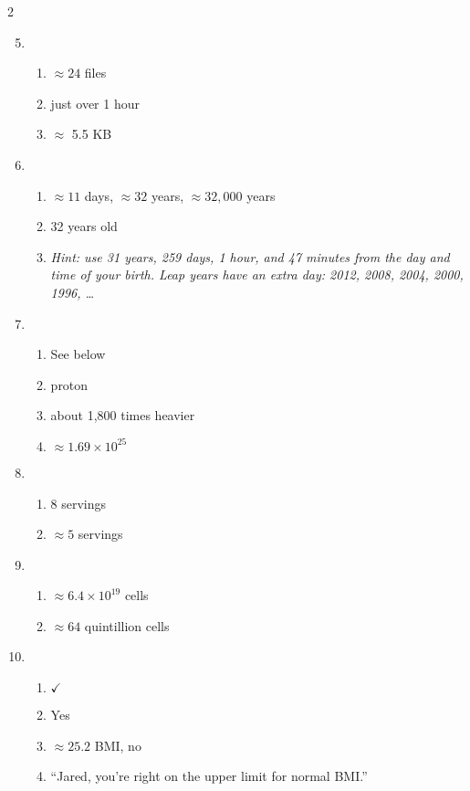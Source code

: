 \begin{multicols} {2}
\begin{enumerate}
\setcounter{enumi}{4}

\item %
\begin{enumerate}
\item $\approx 24$ files
\item just over 1 hour
\item $\approx$ 5.5 KB
\end{enumerate}

\item %
\begin{enumerate}
\item $\approx 11$ days, $\approx 32$ years, $\approx 32,000$ years 
\item 32 years old
\item \emph{Hint: use 31 years, 259 days, 1 hour, and 47 minutes from the day and time of your birth.  Leap years have an extra day:  2012, 2008, 2004, 2000, 1996, \ldots}
\end{enumerate}

\item %
\begin{enumerate}
\item See below
\item proton
\item about 1,800 times heavier
\item $\approx 1.69 \times 10^{25}$
\end{enumerate}

\item %
\begin{enumerate}
\item 8 servings
\item $\approx 5$ servings
\end{enumerate}

\item %
\begin{enumerate}
\item $\approx 6.4 \times 10^{19}$ cells
\item $\approx 64$ quintillion cells
\end{enumerate}

\item %
\begin{enumerate}
\item $\checkmark$
\item Yes
\item $\approx 25.2$ BMI, no
\item ``Jared, you're right on the upper limit for normal BMI.''
\end{enumerate}

\end{enumerate}
\end{multicols}

